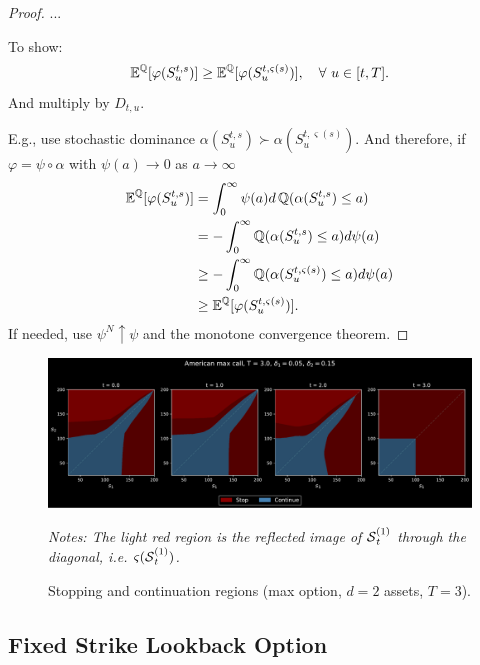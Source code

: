 \begin{proof}
...

To show: 
$$\operatorname{\mathbb{E}}^{\operatorname{\mathbb{Q}}}[ \varphi(S^{t,s}_{u}) ] \ge \operatorname{\mathbb{E}}^{\operatorname{\mathbb{Q}}}[ \varphi(S^{t,\varsigma(s)}_{u}) ], \quad \forall \ u \in [t,T].  $$
And multiply by $D_{t,u}$. 

E.g., use stochastic dominance $\alpha(S^{t,s}_{u}) \succ \alpha(S^{t,\varsigma(s)}_{u})$. And therefore, if $\varphi = \psi \circ \alpha$ with $\psi(a) \to 0$ as $a\to \infty$
\begin{align*}
    \operatorname{\mathbb{E}}^{\operatorname{\mathbb{Q}}}[\varphi(S^{t,s}_{u}) ] &= \int_0^{\infty} \psi(a) d\operatorname{\mathbb{Q}}(\alpha(S^{t,s}_{u}) \le a) \\ 
    &=  - \int_0^{\infty} \operatorname{\mathbb{Q}}(\alpha(S^{t,s}_{u}) \le a) d \psi(a) \\ 
    &\ge  - \int_0^{\infty} \operatorname{\mathbb{Q}}(\alpha(S^{t,\varsigma(s)}_{u}) \le a) d \psi(a) \\ 
     &\ge  \operatorname{\mathbb{E}}^{\operatorname{\mathbb{Q}}}[\varphi(S^{t,\varsigma(s)}_{u}) ].
\end{align*}
 If needed,  use $\psi^N \uparrow \psi$  and the monotone convergence theorem.  
\end{proof}

\begin{figure}
    \centering
    \caption{Stopping and continuation regions (max option, $d=2$ assets, $T=3$).}
    \includegraphics[scale = 0.42]{Figures/AsymMaxCall.pdf}
    \label{fig:asymCall}
    
    \scriptsize{
\textit{Notes: The light red region is the reflected image of $\operatorname{\mathcal{S}}_t^{(1)}$ through the diagonal, i.e. $\varsigma(\operatorname{\mathcal{S}}_t^{(1)})$.}} %
\end{figure}

\subsection{Fixed Strike  Lookback Option} \label{sec:Lkbk}


